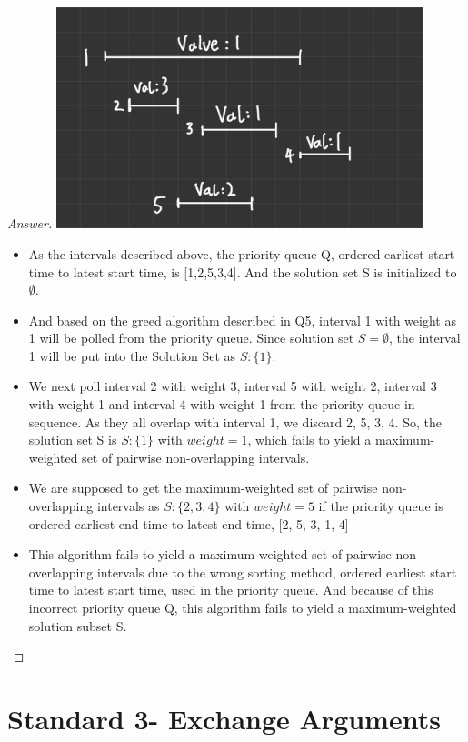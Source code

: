 \documentclass[11pt]{article}
\theoremstyle{definition}
\theoremstyle{definition}
\theoremstyle{definition}
\begin{document}
\begin{proof}[Answer]
\includegraphics[width=0.8\textwidth]{Problem6.PNG}
\begin{itemize}
\item As the intervals described above, the priority queue Q, ordered earliest start time to latest start time, is [1,2,5,3,4]. And the solution set S is initialized to $\emptyset$.
\item And based on the greed algorithm described in Q5, interval 1 with weight as 1 will be polled from the priority queue. Since solution set $S = \emptyset$, the interval 1 will be put into the Solution Set as $S: \{1 \} $.
\item We next poll interval 2 with weight 3, interval 5 with weight 2, interval 3 with weight 1 and interval 4 with weight 1 from the priority queue in sequence. As they all overlap with interval 1, we discard 2, 5, 3, 4. So, the solution set S is $S: \{1 \} $ with $weight = 1$, which fails to yield a maximum-weighted set of pairwise non-overlapping intervals.
\item We are supposed to get the maximum-weighted set of pairwise non-overlapping intervals as $S: \{2,3,4 \}$ with $weight = 5$  if the priority queue is ordered earliest end time to latest end time, [2, 5, 3, 1, 4]
\item This algorithm fails to yield a maximum-weighted set of pairwise non-overlapping intervals due to the wrong sorting method, ordered earliest start time to latest start time, used in the priority queue. And because of this incorrect priority queue Q, this algorithm fails to yield a maximum-weighted solution subset S.
\end{itemize}
\end{proof}




\newpage
\section{Standard 3- Exchange Arguments}
\end{document}
